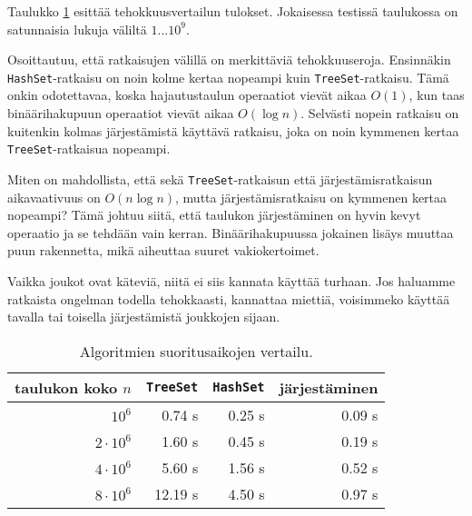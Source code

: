 Taulukko \ref{tab:eriver} esittää tehokkuusvertailun tulokset.
Jokaisessa testissä taulukossa on satunnaisia lukuja väliltä $1 \dots 10^9$.

Osoittautuu, että ratkaisujen välillä on merkittäviä tehokkuuseroja.
Ensinnäkin \texttt{HashSet}-ratkaisu on noin kolme kertaa
nopeampi kuin \texttt{TreeSet}-ratkaisu.
Tämä onkin odotettavaa, koska hajautustaulun
operaatiot vievät aikaa $O(1)$, kun taas binäärihakupuun
operaatiot vievät aikaa $O(\log n)$.
Selvästi nopein ratkaisu on kuitenkin kolmas järjestämistä
käyttävä ratkaisu, joka on noin kymmenen kertaa
\texttt{TreeSet}-ratkaisua nopeampi.

Miten on mahdollista, että sekä \texttt{TreeSet}-ratkaisun että
järjestämisrat\-kaisun aikavaativuus on $O(n \log n)$, mutta
järjestämisratkaisu on kymmenen kertaa nopeampi?
Tämä johtuu siitä, että taulukon järjestäminen on hyvin kevyt
operaatio ja se tehdään vain kerran.
Binäärihakupuussa jokainen lisäys muuttaa puun rakennetta,
mikä aiheuttaa suuret vakiokertoimet.

Vaikka joukot ovat käteviä, niitä ei siis kannata
käyttää turhaan.
Jos haluamme ratkaista ongelman todella tehokkaasti,
kannattaa miettiä, voisimmeko käyttää tavalla tai toisella
järjestämistä joukkojen sijaan.

\begin{table}
\center
\begin{tabular}{rrrr}
taulukon koko $n$ & \texttt{TreeSet} & \texttt{HashSet} & järjestäminen \\
\hline
$10^6$ & 0.74 s & 0.25 s & 0.09 s \\
$2 \cdot 10^6$ & 1.60 s & 0.45 s & 0.19 s \\
$4 \cdot 10^6$ & 5.60 s & 1.56 s & 0.52 s \\
$8 \cdot 10^6$ & 12.19 s & 4.50 s & 0.97 s \\
\end{tabular}
\caption{Algoritmien suoritusaikojen vertailu.}
\label{tab:eriver}
\end{table}
